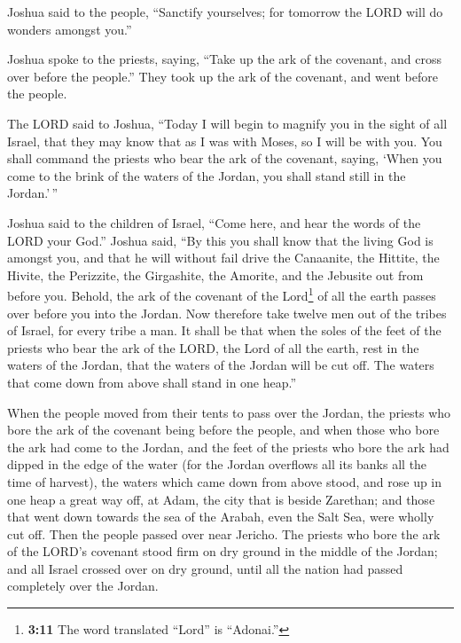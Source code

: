  Joshua said to the people, ``Sanctify yourselves; for
tomorrow the LORD will do wonders amongst you.''

 Joshua spoke to the priests, saying, ``Take up the ark of
the covenant, and cross over before the people.'' They took up the ark
of the covenant, and went before the people.

 The LORD said to Joshua, ``Today I will begin to magnify
you in the sight of all Israel, that they may know that as I was with
Moses, so I will be with you.  You shall command the
priests who bear the ark of the covenant, saying, `When you come to the
brink of the waters of the Jordan, you shall stand still in the
Jordan.'\,''

 Joshua said to the children of Israel, ``Come here, and
hear the words of the LORD your God.''  Joshua said, ``By
this you shall know that the living God is amongst you, and that he will
without fail drive the Canaanite, the Hittite, the Hivite, the
Perizzite, the Girgashite, the Amorite, and the Jebusite out from before
you.  Behold, the ark of the covenant of the
Lord\footnote{\textbf{3:11} The word translated ``Lord'' is ``Adonai.''}
of all the earth passes over before you into the Jordan. 
Now therefore take twelve men out of the tribes of Israel, for every
tribe a man.  It shall be that when the soles of the feet
of the priests who bear the ark of the LORD, the Lord of all the earth,
rest in the waters of the Jordan, that the waters of the Jordan will be
cut off. The waters that come down from above shall stand in one heap.''

 When the people moved from their tents to pass over the
Jordan, the priests who bore the ark of the covenant being before the
people,  and when those who bore the ark had come to the
Jordan, and the feet of the priests who bore the ark had dipped in the
edge of the water (for the Jordan overflows all its banks all the time
of harvest),  the waters which came down from above
stood, and rose up in one heap a great way off, at Adam, the city that
is beside Zarethan; and those that went down towards the sea of the
Arabah, even the Salt Sea, were wholly cut off. Then the people passed
over near Jericho.  The priests who bore the ark of the
LORD's covenant stood firm on dry ground in the middle of the Jordan;
and all Israel crossed over on dry ground, until all the nation had
passed completely over the Jordan.

